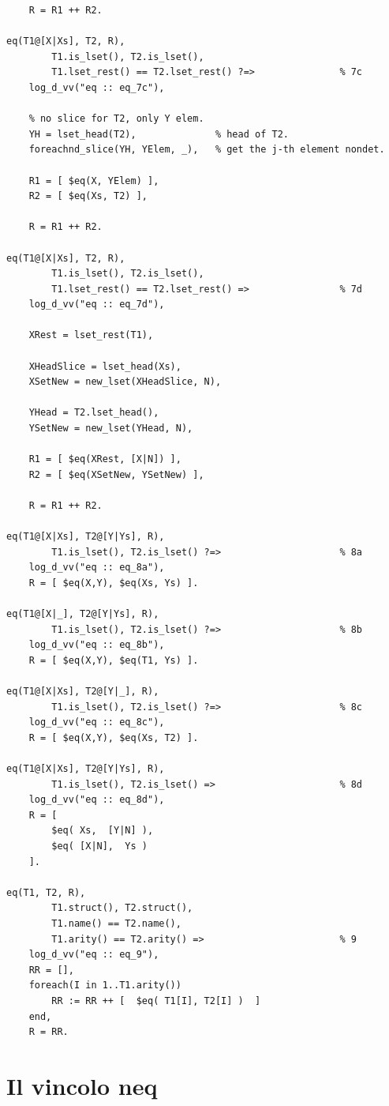 \documentclass[12pt,a4paper,openright]{book} %
\begin{document}
\begin{verbatim}
    R = R1 ++ R2.

eq(T1@[X|Xs], T2, R),
        T1.is_lset(), T2.is_lset(),
        T1.lset_rest() == T2.lset_rest() ?=>               % 7c
    log_d_vv("eq :: eq_7c"),

    % no slice for T2, only Y elem.
    YH = lset_head(T2),              % head of T2.
    foreachnd_slice(YH, YElem, _),   % get the j-th element nondet.

    R1 = [ $eq(X, YElem) ],
    R2 = [ $eq(Xs, T2) ],

    R = R1 ++ R2.

eq(T1@[X|Xs], T2, R),
        T1.is_lset(), T2.is_lset(),
        T1.lset_rest() == T2.lset_rest() =>                % 7d
    log_d_vv("eq :: eq_7d"),

    XRest = lset_rest(T1),

    XHeadSlice = lset_head(Xs),
    XSetNew = new_lset(XHeadSlice, N),

    YHead = T2.lset_head(),
    YSetNew = new_lset(YHead, N),

    R1 = [ $eq(XRest, [X|N]) ],
    R2 = [ $eq(XSetNew, YSetNew) ],

    R = R1 ++ R2.

eq(T1@[X|Xs], T2@[Y|Ys], R),
        T1.is_lset(), T2.is_lset() ?=>                     % 8a
    log_d_vv("eq :: eq_8a"),
    R = [ $eq(X,Y), $eq(Xs, Ys) ].

eq(T1@[X|_], T2@[Y|Ys], R),
        T1.is_lset(), T2.is_lset() ?=>                     % 8b
    log_d_vv("eq :: eq_8b"),
    R = [ $eq(X,Y), $eq(T1, Ys) ].

eq(T1@[X|Xs], T2@[Y|_], R),
        T1.is_lset(), T2.is_lset() ?=>                     % 8c
    log_d_vv("eq :: eq_8c"),
    R = [ $eq(X,Y), $eq(Xs, T2) ].

eq(T1@[X|Xs], T2@[Y|Ys], R),
        T1.is_lset(), T2.is_lset() =>                      % 8d
    log_d_vv("eq :: eq_8d"),
    R = [
        $eq( Xs,  [Y|N] ),
        $eq( [X|N],  Ys )
    ].

eq(T1, T2, R),
        T1.struct(), T2.struct(),
        T1.name() == T2.name(),
        T1.arity() == T2.arity() =>                        % 9
    log_d_vv("eq :: eq_9"),
    RR = [],
    foreach(I in 1..T1.arity())
        RR := RR ++ [  $eq( T1[I], T2[I] )  ]
    end,
    R = RR.
\end{verbatim}

\section{Il vincolo neq}
\end{document}
